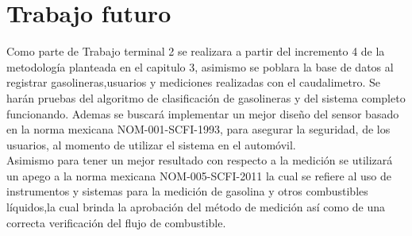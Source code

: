 \chapter{Trabajo futuro}\label{chapter6}
Como parte de Trabajo terminal 2 se realizara a partir del incremento 4 de la metodología planteada en el capitulo 3, asimismo se poblara la base de datos al registrar gasolineras,usuarios y mediciones realizadas con el caudalimetro.
Se harán pruebas del algoritmo de clasificación de gasolineras y del sistema completo funcionando.
Ademas se buscará implementar un mejor diseño del sensor basado en la norma mexicana NOM-001-SCFI-1993, para asegurar la seguridad, de los usuarios, al momento de utilizar el sistema en el automóvil.
\\
Asimismo para tener un mejor resultado con respecto a la medición se utilizará un apego a la norma mexicana NOM-005-SCFI-2011 la cual se refiere al uso de instrumentos y sistemas para la medición de gasolina y otros combustibles líquidos,la cual brinda la aprobación del método de medición así como de una correcta verificación del flujo de combustible.